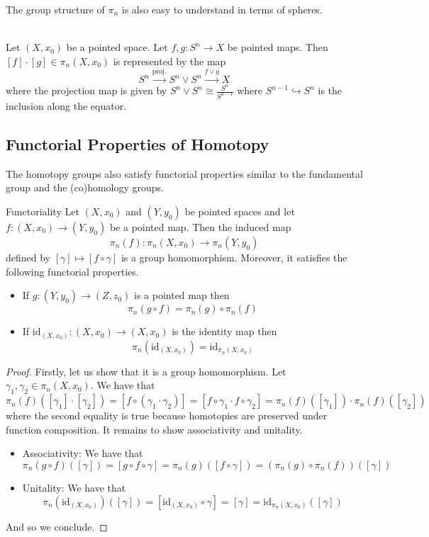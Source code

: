 \documentclass[a4paper]{article}
\begin{document}
The group structure of $\pi_n$ is also easy to understand in terms of spheres. 

\begin{lmm}{}{}\\
Let $(X,x_0)$ be a pointed space. Let $f,g:S^n\to X$ be pointed maps. Then $[f]\cdot[g]\in\pi_n(X,x_0)$ is represented by the map $$S^n\overset{\text{proj.}}{\to} S^n\vee S^n\overset{f\vee g}{\to}X$$ where the projection map is given by $S^n\vee S^n\cong\frac{S^n}{S^{n-1}}$ where $S^{n-1}\hookrightarrow S^n$ is the inclusion along the equator. 
\end{lmm}

\subsection{Functorial Properties of Homotopy}
The homotopy groups also satisfy functorial properties similar to the fundamental group and the (co)homology groups. 

\begin{thm}{Functoriality}{} Let $(X,x_0)$ and $(Y,y_0)$ be pointed spaces and let $f:(X,x_0)\to(Y,y_0)$ be a pointed map. Then the induced map $$\pi_n(f):\pi_n(X,x_0)\to\pi_n(Y,y_0)$$ defined by $[\gamma]\mapsto[f\circ\gamma]$ is a group homomorphism. Moreover, it satisfies the following functorial properties. 
\begin{itemize}
\item If $g:(Y,y_0)\to(Z,z_0)$ is a pointed map then $$\pi_n(g\circ f)=\pi_n(g)\circ\pi_n(f)$$
\item If $\text{id}_{(X,x_0)}:(X,x_0)\to(X,x_0)$ is the identity map then $$\pi_n(\text{id}_{(X,x_0)})=\text{id}_{\pi_n(X,x_0)}$$
\end{itemize} 
\begin{proof}
Firstly, let us show that it is a group homomorphism. Let $\gamma_1,\gamma_2\in\pi_n(X,x_0)$. We have that $$\pi_n(f)([\gamma_1]\cdot[\gamma_2])=[f\circ(\gamma_1\cdot\gamma_2)]=[f\circ\gamma_1\cdot f\circ\gamma_2]=\pi_n(f)([\gamma_1])\cdot\pi_n(f)([\gamma_2])$$ where the second equality is true because homotopies are preserved under function composition. It remains to show associativity and unitality. 
\begin{itemize}
\item Associativity: We have that $$\pi_n(g\circ f)([\gamma])=[g\circ f\circ\gamma]=\pi_n(g)([f\circ\gamma])=(\pi_n(g)\circ\pi_n(f))([\gamma])$$
\item Unitality: We have that $$\pi_n(\text{id}_{(X,x_0)})([\gamma])=[\text{id}_{(X,x_0)}\circ\gamma]=[\gamma]=\text{id}_{\pi_n(X,x_0)}([\gamma])$$
\end{itemize}
And so we conclude. 
\end{proof}
\end{thm}
\end{document}
